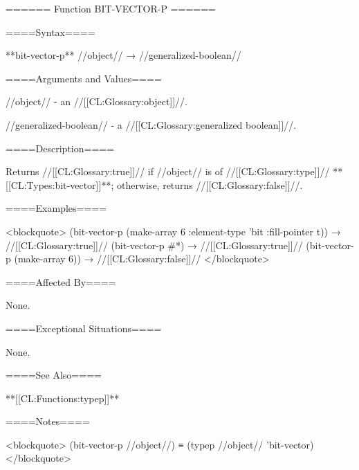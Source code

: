 ====== Function BIT-VECTOR-P ======

====Syntax====

**bit-vector-p** //object// → //generalized-boolean//

====Arguments and Values====

//object// - an //[[CL:Glossary:object]]//.

//generalized-boolean// - a //[[CL:Glossary:generalized boolean]]//.

====Description====

Returns //[[CL:Glossary:true]]// if //object// is of //[[CL:Glossary:type]]// **[[CL:Types:bit-vector]]**; otherwise, returns //[[CL:Glossary:false]]//.

====Examples====

<blockquote> (bit-vector-p (make-array 6 :element-type 'bit :fill-pointer t)) → //[[CL:Glossary:true]]// (bit-vector-p #*) → //[[CL:Glossary:true]]// (bit-vector-p (make-array 6)) → //[[CL:Glossary:false]]// </blockquote>

====Affected By====

None.

====Exceptional Situations====

None.

====See Also====

**[[CL:Functions:typep]]**

====Notes====

<blockquote> (bit-vector-p //object//) ≡ (typep //object// 'bit-vector) </blockquote>

